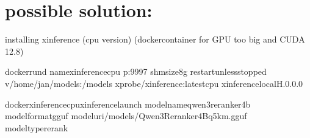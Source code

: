\documentclass[letterpaper,10pt,english]{sphinxmanual}
\begin{document}
\section{possible solution:}
\label{\detokenize{homelab:possible-solution}}
\sphinxAtStartPar
installing xinference (cpu version) (dockercontainer for GPU too big and CUDA 12.8)

\begin{sphinxVerbatim}[commandchars=\\\{\}]
dockerrun\PYGZhy{}d
\PYGZhy{}\PYGZhy{}namexinference\PYGZhy{}cpu
\PYGZhy{}p:9997
\PYGZhy{}\PYGZhy{}shm\PYGZhy{}size8g
\PYGZhy{}\PYGZhy{}restartunless\PYGZhy{}stopped
\PYGZhy{}v/home/jan/models:/models
xprobe/xinference:latest\PYGZhy{}cpu
xinference\PYGZhy{}local\PYGZhy{}H.0.0.0
\end{sphinxVerbatim}

\begin{sphinxVerbatim}[commandchars=\\\{\}]
dockerxinference\PYGZhy{}cpuxinferencelaunch
\PYGZhy{}\PYGZhy{}model\PYGZhy{}nameqwen3\PYGZhy{}reranker\PYGZhy{}4b
\PYGZhy{}\PYGZhy{}model\PYGZhy{}formatgguf
\PYGZhy{}\PYGZhy{}model\PYGZhy{}uri/models/Qwen3\PYGZhy{}Reranker\PYGZhy{}4B\PYGZhy{}q5\PYGZus{}k\PYGZus{}m.gguf
\PYGZhy{}\PYGZhy{}model\PYGZhy{}typererank
\end{sphinxVerbatim}
\end{document}
